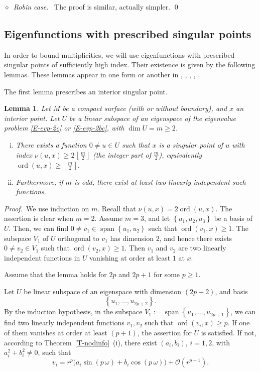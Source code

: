 \documentclass[12pt,a4paper]{amsart}
\theoremstyle{plain} %
\newtheorem{lemma}[theorem]{Lemma}
\theoremstyle{definition}
\numberwithin{equation}{section}
\numberwithin{figure}{section}
\numberwithin{table}{section}
\newcommand{\cO}{\mathcal{O}}
\DeclareMathOperator{\ord}{ord}
\DeclareMathOperator{\spanop}{span}
\newcommand{\pf}{\emph{Proof.~}}
\newcommand{\set}[1]{\left\lbrace #1 \right\rbrace}
\newcommand{\spanv}[1]{\spanop\!\left\lbrace #1 \right\rbrace}
\newcommand{\noid}{\noindent $\diamond$~}
\newcommand{\floor}[1]{\left\lfloor #1 \right\rfloor}
\begin{document}
\emph{\noid Robin case.}~ The proof is similar, actually simpler. \hfill\qed



\subsection{Eigenfunctions with prescribed singular points}\label{SS-evp3}

\phantom{}  In order to bound multiplicities, we will use eigenfunctions with   prescribed  singular points of sufficiently high index. Their existence is given by the following lemmas.  These lemmas appear in one form or another in \cite[Theorem~3.4]{Chen1976}, \cite[Theorem~2.1]{Bess1980}, \cite[Lemma~4]{Nadi1987}, \cite[Proposition~2]{HoHN1999}, \cite[Lemma~2.9]{HoMN1999}.\medskip


The first lemma prescribes an interior singular point.

\begin{lemma}\label{L-zeroi} Let $M$ be a compact surface (with or without boundary), and $x$ an interior point. Let $U$ be a linear subspace of an eigenspace of the eigenvalue problem \eqref{E-evp-2c} or \eqref{E-evp-2bc}, with $\dim U = m \ge 2$.
\begin{enumerate}[(i)]
\item There exists a function $0 \not = u\in U$ such that $x$ is a singular point of $u$ with index $\nu(u,x) \ge 2\,\floor{\frac m2}$ (the integer part of $\frac m2$), equivalently $\ord(u,x) \ge \floor{\frac m2}$.
\item Furthermore, if $m$ is odd, there exist at least two linearly independent such functions.
\end{enumerate}
\end{lemma}

\pf We use induction on $m$.  Recall that $\nu(u,x) = 2\ord(u,x)$. The assertion is clear when $m=2$. Assume $m=3$, and let $\set{u_1,u_2,u_3}$ be a basis of $U$. Then, we can find $0 \not = v_1 \in \spanv{u_1,u_2}$ such that $\ord(v_1,x) \ge 1$. The subspace $V_1$ of $U$ orthogonal to $v_1$ has dimension $2$, and hence there exists $0 \not = v_2 \in V_1$ such that $\ord(v_2,x) \ge 1$. Then $v_1$ and $v_2$ are two linearly independent functions in $U$ vanishing at order at least $1$ at $x$.\medskip

Assume that the lemma holds for $2p$ and $2p+1$ for some $p \ge 1$.\medskip

Let $U$ be linear subspace of an eigenspace with dimension $(2p+2)$, and basis $$\set{u_1,\ldots,u_{2p+2}}.$$ By the induction hypothesis, in the subspace $V_1 := \spanv{u_1,\ldots,u_{2p+1}}$, we can find two linearly independent functions $v_1, v_2$ such that $\ord(v_i,x) \ge p$. If one of them vanishes at order at least $(p+1)$, the assertion for $U$ is satisfied. If not, according to Theorem~\ref{T-nodinfo}~(i), there exist $(a_i,b_i)$, $i=1,2$, with $a_i^2+b_i^2 \not = 0$, such that
%
\begin{equation*}
v_i = r^{p} \big( a_i \sin(p\, \omega) + b_i \cos(p\, \omega) \big) +\cO(r^{p+1}).
\end{equation*}
\end{document}
